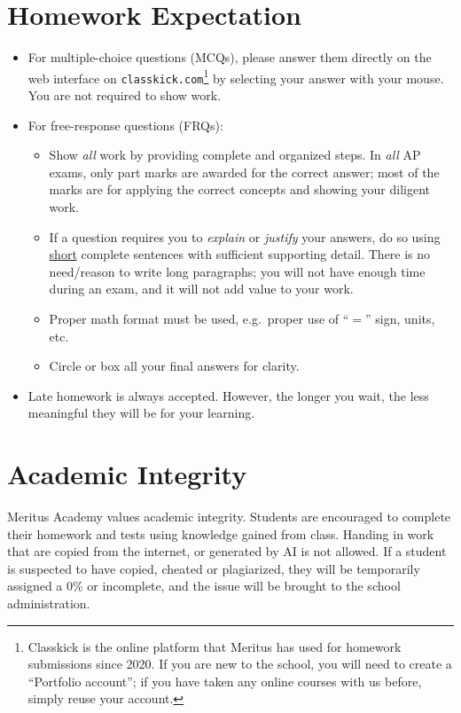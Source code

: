 \documentclass{../../oss-handout}
\begin{document}
\section{Homework Expectation}
\begin{itemize}[nosep]
\item For multiple-choice questions (MCQs), please answer them directly on the
  web interface on \texttt{classkick.com}\footnote{Classkick is the online
  platform that Meritus has used for homework submissions since 2020. If you are
  new to the school, you will need to create a ``Portfolio account''; if you
  have taken any online courses with us before, simply reuse your account.} by
  selecting your answer with your mouse. You are not required to show work.
\item For free-response questions (FRQs):
  \begin{itemize}[nosep]
  \item Show \emph{all} work by providing complete and organized steps. In
    \emph{all} AP exams, only part marks are awarded for the correct answer;
    most of the marks are for applying the correct concepts and showing your
    diligent work.
  \item If a question requires you to \emph{explain} or \emph{justify} your
    answers, do so using \underline{short} complete sentences with sufficient
    supporting detail. There is no need/reason to write long paragraphs; you
    will not have enough time during an exam, and it will not add value to
    your work.
  \item Proper math format must be used, e.g.\ proper use of ``$=$'' sign,
    units, etc.
  \item Circle or box all your final answers for clarity.
  \end{itemize}
\item Late homework is always accepted. However, the longer you wait, the less
  meaningful they will be for your learning.
\end{itemize}



\section{Academic Integrity}
Meritus Academy values academic integrity. Students are encouraged to complete
their homework and tests using knowledge gained from class. Handing in work
that are copied from the internet, or generated by AI is not allowed. If a
student is suspected to have copied, cheated or plagiarized, they will be
temporarily assigned a 0\% or incomplete, and the issue will be brought to the
school administration.
\end{document}
